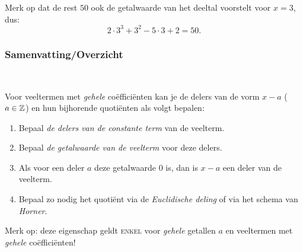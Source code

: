 \documentclass{ximera}
\begin{document}
\noindent Merk op dat de rest $50$ ook de getalwaarde van het
deeltal voorstelt voor $x=3$, dus:  \[2\cdot3^3+3^2-5\cdot3+2=50.\]

\subsubsection*{Samenvatting/Overzicht}
\begin{proposition} \ 
    
Voor veeltermen met \textit{gehele} coëfficiënten  kan je de delers van de vorm $x-a$ ($a \in \mathbb{Z}$) en hun bijhorende quoti\"{e}nten als volgt bepalen:\\
\begin{enumerate}
\item Bepaal \textit{de delers van de constante term} van de veelterm.
\item Bepaal \textit{de getalwaarde van de veelterm} voor deze delers.
\item Als voor een deler $a$ deze getalwaarde $0$ is, dan is $x-a$ een deler van de veelterm.
\item Bepaal zo nodig het quoti\"{e}nt via de \textit{Euclidische deling} of via het schema van \textit{Horner}.
\end{enumerate}
Merk op: deze eigenschap geldt \textsc{enkel} voor \textit{gehele} getallen $a$ en veeltermen met \textit{gehele} coëfficiënten!
\end{proposition}

\end{document}
